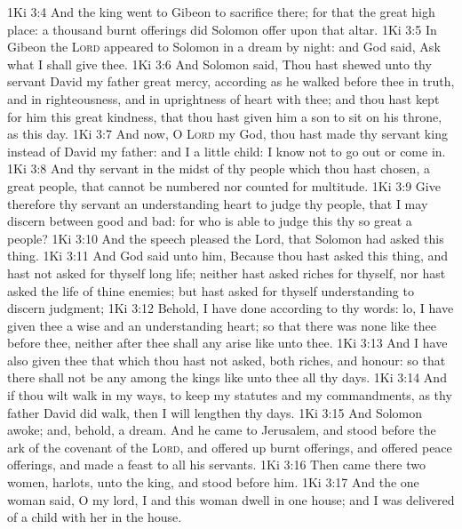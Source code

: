 \vs 1Ki 3:4 And the king went to Gibeon to sacrifice there; for that  the great high place: a thousand burnt offerings did Solomon offer upon that altar.
\vs 1Ki 3:5 In Gibeon the \textsc{Lord} appeared to Solomon in a dream by night: and God said, Ask what I shall give thee.
\vs 1Ki 3:6 And Solomon said, Thou hast shewed unto thy servant David my father great mercy, according as he walked before thee in truth, and in righteousness, and in uprightness of heart with thee; and thou hast kept for him this great kindness, that thou hast given him a son to sit on his throne, as  this day.
\vs 1Ki 3:7 And now, O \textsc{Lord} my God, thou hast made thy servant king instead of David my father: and I  a little child: I know not  to go out or come in.
\vs 1Ki 3:8 And thy servant  in the midst of thy people which thou hast chosen, a great people, that cannot be numbered nor counted for multitude.
\vs 1Ki 3:9 Give therefore thy servant an understanding heart to judge thy people, that I may discern between good and bad: for who is able to judge this thy so great a people?
\vs 1Ki 3:10 And the speech pleased the Lord, that Solomon had asked this thing.
\vs 1Ki 3:11 And God said unto him, Because thou hast asked this thing, and hast not asked for thyself long life; neither hast asked riches for thyself, nor hast asked the life of thine enemies; but hast asked for thyself understanding to discern judgment;
\vs 1Ki 3:12 Behold, I have done according to thy words: lo, I have given thee a wise and an understanding heart; so that there was none like thee before thee, neither after thee shall any arise like unto thee.
\vs 1Ki 3:13 And I have also given thee that which thou hast not asked, both riches, and honour: so that there shall not be any among the kings like unto thee all thy days.
\vs 1Ki 3:14 And if thou wilt walk in my ways, to keep my statutes and my commandments, as thy father David did walk, then I will lengthen thy days.
\vs 1Ki 3:15 And Solomon awoke; and, behold,  a dream. And he came to Jerusalem, and stood before the ark of the covenant of the \textsc{Lord}, and offered up burnt offerings, and offered peace offerings, and made a feast to all his servants.
\vs 1Ki 3:16 Then came there two women,  harlots, unto the king, and stood before him.
\vs 1Ki 3:17 And the one woman said, O my lord, I and this woman dwell in one house; and I was delivered of a child with her in the house.
